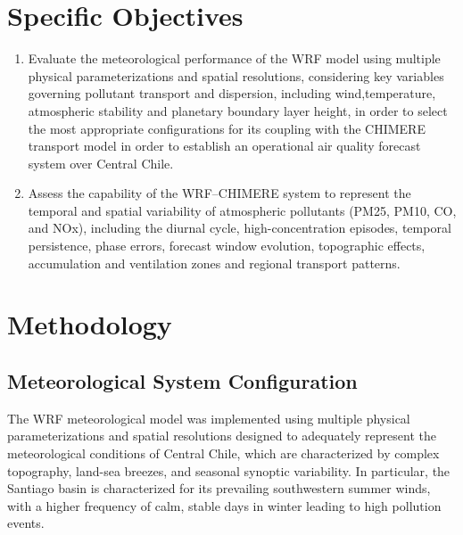 \documentclass[
]{article}
\providecommand{\tightlist}{%
  \setlength{\itemsep}{0pt}\setlength{\parskip}{0pt}}
\begin{document}
\section{\texorpdfstring{\textbf{Specific
Objectives}}{Specific Objectives}}\label{specific-objectives}

\begin{enumerate}
\def\labelenumi{\arabic{enumi}.}
\tightlist
\item  Evaluate the meteorological performance of the WRF model using
  multiple physical parameterizations and spatial resolutions,
  considering key variables governing pollutant transport and
  dispersion, including wind,temperature, atmospheric stability and
  planetary boundary layer height, in order to select the most
  appropriate configurations for its coupling with the CHIMERE transport
  model in order to establish an operational air quality forecast system
  over Central Chile.\\
\item  Assess the capability of the WRF--CHIMERE system to represent the
  temporal and spatial variability of atmospheric pollutants (PM25,
  PM10, CO, and NOx), including the diurnal cycle, high-concentration
  episodes, temporal persistence, phase errors, forecast window
  evolution, topographic effects, accumulation and ventilation zones and
  regional transport patterns.
\end{enumerate}

\section{\texorpdfstring{\textbf{Methodology}}{Methodology}}\label{methodology}

\subsection{\texorpdfstring{\textbf{Meteorological System
Configuration}}{Meteorological System Configuration}}\label{meteorological-system-configuration}

The WRF meteorological model was implemented using multiple physical
parameterizations and spatial resolutions designed to adequately
represent the meteorological conditions of Central Chile, which are
characterized by complex topography, land-sea breezes, and seasonal synoptic variability. In particular, the Santiago basin is characterized for its prevailing southwestern summer winds, with a higher frequency of calm, stable days in winter leading to high pollution events.
\end{document}
